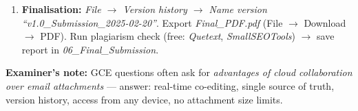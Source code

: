 \documentclass[11pt]{article}
\begin{document}
\begin{exoresolu}
\begin{enumerate}
\begin{itemize}
                  \item Voice typing (mic icon in Docs mobile) helps write long sections without typing on phone keyboard.
              \end{itemize}
        \item \textbf{Finalisation:} \textit{File $\rightarrow$ Version history $\rightarrow$ Name version ``v1.0\_Submission\_2025-02-20''}. Export \textit{Final\_PDF.pdf} (File $\rightarrow$ Download $\rightarrow$ PDF). Run plagiarism check (free: \textit{Quetext}, \textit{SmallSEOTools}) $\rightarrow$ save report in \textit{06\_Final\_Submission}.
    \end{enumerate}
    \textbf{Examiner's note:} GCE questions often ask for \textit{advantages of cloud collaboration over email attachments} — answer: real-time co-editing, single source of truth, version history, access from any device, no attachment size limits.
\end{exoresolu}
\end{document}
